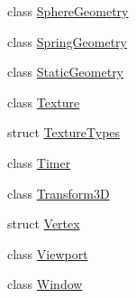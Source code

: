 \begin{DoxyCompactItemize}
\item 
class \mbox{\hyperlink{classec_1_1_sphere_geometry}{Sphere\+Geometry}}
\item 
class \mbox{\hyperlink{classec_1_1_spring_geometry}{Spring\+Geometry}}
\item 
class \mbox{\hyperlink{classec_1_1_static_geometry}{Static\+Geometry}}
\item 
class \mbox{\hyperlink{classec_1_1_texture}{Texture}}
\item 
struct \mbox{\hyperlink{structec_1_1_texture_types}{Texture\+Types}}
\item 
class \mbox{\hyperlink{classec_1_1_timer}{Timer}}
\item 
class \mbox{\hyperlink{classec_1_1_transform3_d}{Transform3D}}
\item 
struct \mbox{\hyperlink{structec_1_1_vertex}{Vertex}}
\item 
class \mbox{\hyperlink{classec_1_1_viewport}{Viewport}}
\item 
class \mbox{\hyperlink{classec_1_1_window}{Window}}
\end{DoxyCompactItemize}

